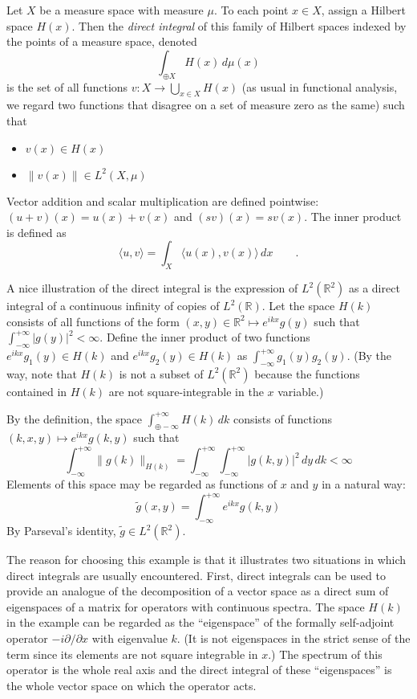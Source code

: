 \documentclass[12pt]{article}
\begin{document}
Let $X$ be a measure space with measure $\mu$.  To each point $x \in X$, assign a Hilbert space $H(x)$.  Then the \emph{direct integral} of this family of Hilbert spaces indexed by the points of a measure space, denoted
 $$\int_{\oplus X} H(x) \, d\mu(x)$$
is the set of all functions $v \colon X \to \bigcup_{x \in X} H(x)$ (as usual in functional analysis, we regard two functions that disagree on a set of measure zero as the same) such that
\begin{itemize}
\item $v(x) \in H(x)$
\item $\| v(x) \| \in L^2 (X,\mu)$
\end{itemize}
Vector addition and scalar multiplication are defined pointwise: $(u + v) (x) = u(x) + v(x)$ and $(sv) (x) = s v(x)$.  The inner product is defined as
 $$\langle u, v \rangle = \int_X \langle u(x), v(x) \rangle \, dx \qquad.$$

A nice illustration of the direct integral is the expression of $L^2 (\mathbb{R}^2)$ as a direct integral of a continuous infinity of copies of $L^2 (\mathbb{R})$.  Let the space $H(k)$ consists of all functions of the form $(x,y) \in \mathbb{R}^2 \mapsto e^{ikx} g(y)$ such that $\int_{-\infty}^{+\infty} |g(y)|^2 < \infty$.  Define the inner product of two functions $e^{ikx} g_1(y) \in H(k)$ and $e^{ikx} g_2(y) \in H(k)$ as $\int_{-\infty}^{+\infty} g_1 (y) g_2 (y)$.  (By the way, note that $H(k)$ is not a subset of $L^2 (\mathbb{R}^2)$ because the functions contained in $H(k)$ are not square-integrable in the $x$ variable.)

By the definition, the space $\int_{\oplus -\infty}^{+\infty} H(k) \, dk$ consists of functions $(k,x,y) \mapsto e^{ikx} g(k,y)$ such that
 $$\int_{-\infty}^{+\infty} \|g(k)\|_{H(k)} = \int_{-\infty}^{+\infty} \int_{-\infty}^{+\infty} |g(k,y)|^2 \,dy \,dk < \infty$$
Elements of this space may be regarded as functions of $x$ and $y$ in a natural way:
 $$\tilde g(x,y) = \int_{-\infty}^{+\infty} e^{ikx} g(k,y)$$
By Parseval's identity, $\tilde g \in L^2 (\mathbb{R}^2)$.

The reason for choosing this example is that it illustrates two situations in which direct integrals are usually encountered.  First, direct integrals can be used to provide an analogue of the decomposition of a vector space as a direct sum of eigenspaces of a matrix for operators with continuous spectra.  The space $H(k)$ in the example can be regarded as the ``eigenspace'' of the formally self-adjoint operator $-i \partial / \partial x$ with eigenvalue $k$.  (It is  not eigenspaces in the strict sense of the term since its elements are not square integrable in $x$.)  The spectrum of this operator is the whole real axis and the direct integral of these ``eigenspaces'' is the whole vector space on which the operator acts.
\end{document}

